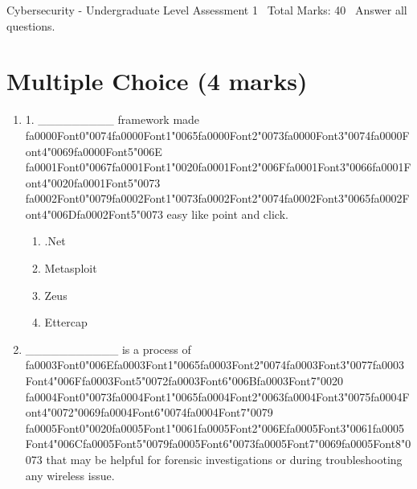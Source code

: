\documentclass[12pt]{article}
\begin{document}
\begin{center}
Cybersecurity - Undergraduate Level Assessment 1 \
Total Marks: 40 \
Answer all questions.
\end{center}

\section*{Multiple Choice (4 marks)}
\begin{enumerate}[label=\arabic*.]
\item 1. \_\_\_\_\_\_\_\_\_ framework made {\csname fa0000Font0\endcsname\char"0074}{\csname fa0000Font1\endcsname\char"0065}{\csname fa0000Font2\endcsname\char"0073}{\csname fa0000Font3\endcsname\char"0074}{\csname fa0000Font4\endcsname\char"0069}{\csname fa0000Font5\endcsname\char"006E} {\csname fa0001Font0\endcsname\char"0067}{\csname fa0001Font1\endcsname\char"0020}{\csname fa0001Font2\endcsname\char"006F}{\csname fa0001Font3\endcsname\char"0066}{\csname fa0001Font4\endcsname\char"0020}{\csname fa0001Font5\endcsname\char"0073} {\csname fa0002Font0\endcsname\char"0079}{\csname fa0002Font1\endcsname\char"0073}{\csname fa0002Font2\endcsname\char"0074}{\csname fa0002Font3\endcsname\char"0065}{\csname fa0002Font4\endcsname\char"006D}{\csname fa0002Font5\endcsname\char"0073} easy like point and click.
\begin{enumerate}[label=(\alph*)]
    \item .Net
    \item Metasploit
    \item Zeus
    \item Ettercap
\end{enumerate}
\item \_\_\_\_\_\_\_\_\_\_\_ is a process of {\csname fa0003Font0\endcsname\char"006E}{\csname fa0003Font1\endcsname\char"0065}{\csname fa0003Font2\endcsname\char"0074}{\csname fa0003Font3\endcsname\char"0077}{\csname fa0003Font4\endcsname\char"006F}{\csname fa0003Font5\endcsname\char"0072}{\csname fa0003Font6\endcsname\char"006B}{\csname fa0003Font7\endcsname\char"0020} {\csname fa0004Font0\endcsname\char"0073}{\csname fa0004Font1\endcsname\char"0065}{\csname fa0004Font2\endcsname\char"0063}{\csname fa0004Font3\endcsname\char"0075}{\csname fa0004Font4\endcsname\char"0072}{\char"0069}{\csname fa0004Font6\endcsname\char"0074}{\csname fa0004Font7\endcsname\char"0079} {\csname fa0005Font0\endcsname\char"0020}{\csname fa0005Font1\endcsname\char"0061}{\csname fa0005Font2\endcsname\char"006E}{\csname fa0005Font3\endcsname\char"0061}{\csname fa0005Font4\endcsname\char"006C}{\csname fa0005Font5\endcsname\char"0079}{\csname fa0005Font6\endcsname\char"0073}{\csname fa0005Font7\endcsname\char"0069}{\csname fa0005Font8\endcsname\char"0073} that may be helpful for forensic investigations or during troubleshooting any wireless issue.

\end{enumerate}
\end{document}
